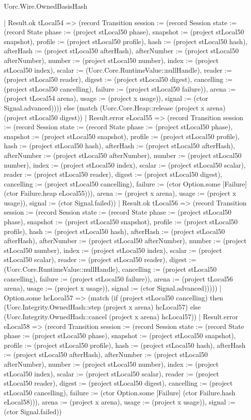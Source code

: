 \begin{lexlean}{Uorc.Wire.OwnedBasisHash}
\begin{semanticmodule}
{      | Result.ok tLocal54 => (record Transition {session := (record Session {state := (record State {phase := (project stLocal50 phase), snapshot := (project stLocal50 snapshot), profile := (project stLocal50 profile), hash := (project stLocal50 hash), afterHash := (project stLocal50 afterHash), afterNumber := (project stLocal50 afterNumber), number := (project stLocal50 number), index := (project stLocal50 index), scalar := (Uorc.Core.RuntimeValue::nullHandle), reader := (project stLocal50 reader), digest := (project stLocal50 digest), cancelling := (project stLocal50 cancelling), failure := (project stLocal50 failure)}), arena := (project tLocal54 arena), usage := (project x usage)}), signal := (ctor Signal.advanced)}))) else (match (Uorc.Core.Heap::release (project x arena) (project stLocal50 digest))
      | Result.error eLocal55 => (record Transition {session := (record Session {state := (record State {phase := (project stLocal50 phase), snapshot := (project stLocal50 snapshot), profile := (project stLocal50 profile), hash := (project stLocal50 hash), afterHash := (project stLocal50 afterHash), afterNumber := (project stLocal50 afterNumber), number := (project stLocal50 number), index := (project stLocal50 index), scalar := (project stLocal50 scalar), reader := (project stLocal50 reader), digest := (project stLocal50 digest), cancelling := (project stLocal50 cancelling), failure := (ctor Option.some [Failure] (ctor Failure.heap eLocal55))}), arena := (project x arena), usage := (project x usage)}), signal := (ctor Signal.failed)})
      | Result.ok tLocal56 => (record Transition {session := (record Session {state := (record State {phase := (project stLocal50 phase), snapshot := (project stLocal50 snapshot), profile := (project stLocal50 profile), hash := (project stLocal50 hash), afterHash := (project stLocal50 afterHash), afterNumber := (project stLocal50 afterNumber), number := (project stLocal50 number), index := (project stLocal50 index), scalar := (project stLocal50 scalar), reader := (project stLocal50 reader), digest := (Uorc.Core.RuntimeValue::nullHandle), cancelling := (project stLocal50 cancelling), failure := (project stLocal50 failure)}), arena := (project tLocal56 arena), usage := (project x usage)}), signal := (ctor Signal.advanced)}))))
    | Option.some hcLocal57 => (match (if (project stLocal50 cancelling) then (Uorc.Integrity.OwnedHash::step (project x arena) hcLocal57) else (Uorc.Integrity.OwnedHash::cancel (project x arena) hcLocal57))
      | Result.error eLocal58 => (record Transition {session := (record Session {state := (record State {phase := (project stLocal50 phase), snapshot := (project stLocal50 snapshot), profile := (project stLocal50 profile), hash := (project stLocal50 hash), afterHash := (project stLocal50 afterHash), afterNumber := (project stLocal50 afterNumber), number := (project stLocal50 number), index := (project stLocal50 index), scalar := (project stLocal50 scalar), reader := (project stLocal50 reader), digest := (project stLocal50 digest), cancelling := (project stLocal50 cancelling), failure := (ctor Option.some [Failure] (ctor Failure.hash eLocal58))}), arena := (project x arena), usage := (project x usage)}), signal := (ctor Signal.failed)})
}
\end{semanticmodule}
\end{lexlean}
